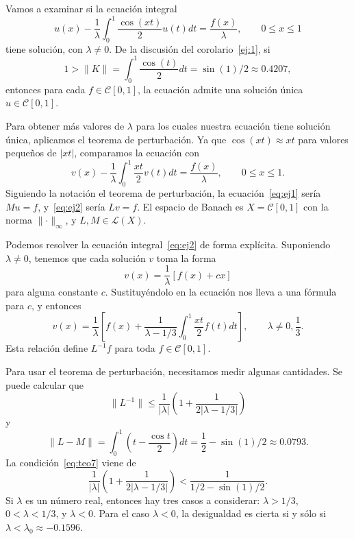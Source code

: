 \begin{ejemplo}
	Vamos a examinar si la ecuación integral
	\begin{equation}\label{eq:ej1}
		u(x) - \dfrac{1}{\lambda} \int_{0}^{1} \dfrac{\cos(xt)}{2}u(t)dt = \dfrac{f(x)}{\lambda}, \qquad 0 \leqslant x \leqslant 1
	\end{equation}
	tiene solución, con $\lambda \neq 0$. De la discusión del corolario~\eqref{ej:1}, si
	\begin{equation}\label{ej:2}
	1 > \lVert K \rVert = \int_{0}^{1}\dfrac{\cos(t)}{2}dt = \sin (1)/2 \approx 0.4207,
	\end{equation}
	entonces para cada $f \in \mathcal{C}[0,1]$, la ecuación admite una solución única $u \in \mathcal{C}[0,1]$.
	
	Para obtener más valores de $\lambda$ para los cuales nuestra ecuación tiene solución única, aplicamos el teorema de perturbación. Ya que $\cos(xt) \approx xt$ para valores pequeños de $|xt|$, comparamos la ecuación con
	\begin{equation}\label{eq:ej2}
		v(x) - \dfrac{1}{\lambda}\int_{0}^{1} \dfrac{xt}{2}v(t)dt = \dfrac{f(x)}{\lambda}, \qquad 0 \leqslant x \leqslant 1.
	\end{equation}
	Siguiendo la notación el teorema de perturbación, la ecuación~\eqref{eq:ej1} sería $Mu = f$, y~\eqref{eq:ej2} sería $Lv = f$. El espacio de Banach es $X = \mathcal{C}[0,1]$ con la norma $\lVert \cdot \rVert_\infty$, y $L,M \in \mathcal{L}(X)$.
	
	Podemos resolver la ecuación integral~\eqref{eq:ej2} de forma explícita. Suponiendo $\lambda \neq 0$, tenemos que cada solución $v$ toma la forma
	\begin{equation}
		v(x) = \dfrac{1}{\lambda}[f(x)+cx]
	\end{equation}
	para alguna constante $c$. Sustituyéndolo en la ecuación nos lleva a una fórmula para $c$, y entonces
	\begin{equation}
		v(x) = \dfrac{1}{\lambda}[f(x) + \dfrac{1}{\lambda - 1/3}\int_{0}^{1}\dfrac{xt}{2}f(t)dt], \qquad \lambda \neq 0,\dfrac{1}{3}.
	\end{equation}
	Esta relación define $L^{-1}f$ para toda $f \in \mathcal{C}[0,1]$.
	
	Para usar el teorema de perturbación, necesitamos medir algunas cantidades. Se puede calcular que
	\begin{equation}
		\lVert L^{-1} \rVert \leqslant \dfrac{1}{|\lambda|}(1 + \dfrac{1}{2|\lambda - 1/3|})
	\end{equation}
	y
	\begin{equation}
		\lVert L-M \rVert = \int_{0}^{1} (t - \dfrac{\cos t}{2})dt = \dfrac{1}{2} - \sin(1)/2 \approx 0.0793.
	\end{equation}
	La condición~\eqref{eq:teo7} viene de
	\begin{equation}\label{ej:3}
		\dfrac{1}{|\lambda|}(1+\dfrac{1}{2|\lambda - 1/3|}) < \dfrac{1}{1/2 - \sin(1)/2}.
	\end{equation}
	Si $\lambda$ es un número real, entonces hay tres casos a considerar: $\lambda > 1/3$, $0 < \lambda < 1/3$, y $\lambda < 0$. Para el caso $\lambda < 0$, la desigualdad es cierta si y sólo si $\lambda < \lambda_0 \approx -0.1596$.
	

\end{ejemplo}
